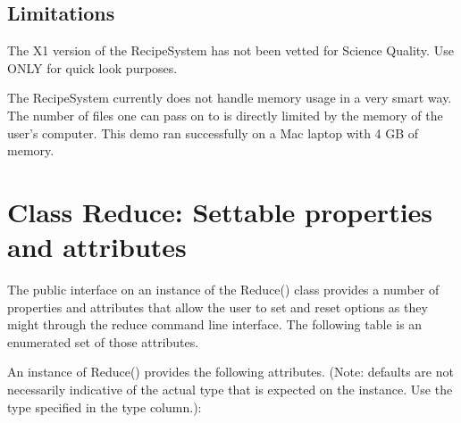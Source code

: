 \documentclass[letterpaper,10pt,english]{sphinxmanual}
\begin{document}
\section{Limitations}
\label{appendices/appendix_demo:limitations}
The X1 version of the RecipeSystem has not been vetted for Science Quality.
Use ONLY for quick look purposes.

The RecipeSystem currently does not handle memory usage in a very smart way.
The number of files one can pass on to  is directly limited by the
memory of the user's computer.  This demo ran successfully on a Mac laptop
with 4 GB of memory.


\chapter{Class Reduce: Settable properties and attributes}
\label{appendices/reduce_properties:class-reduce-settable-properties-and-attributes}\label{appendices/reduce_properties::doc}\label{appendices/reduce_properties:props}
The public interface on an instance of the Reduce() class provides a
number of properties and attributes that allow the user to set and reset
options as they might through the reduce command line interface. The following
table is an enumerated set of those attributes.

An instance of Reduce() provides the following attributes. (Note: defaults
are not necessarily indicative of the actual type that is expected on
the instance. Use the type specified in the type column.):
\end{document}
